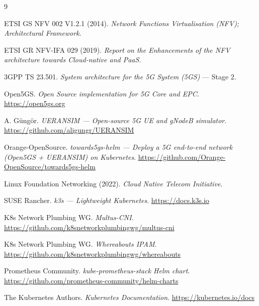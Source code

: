\documentclass[12pt]{article}
\begin{document}
\newpage
\begin{thebibliography}{9}

ETSI GS NFV 002 V1.2.1 (2014). \textit{Network Functions Virtualisation (NFV); Architectural Framework}.

ETSI GR NFV-IFA 029 (2019). \textit{Report on the Enhancements of the NFV architecture towards Cloud-native and PaaS}.

3GPP TS 23.501. \textit{System architecture for the 5G System (5GS)} --- Stage 2.

Open5GS. \textit{Open Source implementation for 5G Core and EPC}. \url{https://open5gs.org}

A. G\"ung\"or. \textit{UERANSIM --- Open-source 5G UE and gNodeB simulator}. \url{https://github.com/aligungr/UERANSIM}

Orange-OpenSource. \textit{towards5gs-helm --- Deploy a 5G end-to-end network (Open5GS + UERANSIM) on Kubernetes}. \url{https://github.com/Orange-OpenSource/towards5gs-helm}

Linux Foundation Networking (2022). \textit{Cloud Native Telecom Initiative}.

SUSE Rancher. \textit{k3s — Lightweight Kubernetes}. \url{https://docs.k3s.io}

K8s Network Plumbing WG. \textit{Multus-CNI}. \url{https://github.com/k8snetworkplumbingwg/multus-cni}

K8s Network Plumbing WG. \textit{Whereabouts IPAM}. \url{https://github.com/k8snetworkplumbingwg/whereabouts}

Prometheus Community. \textit{kube-prometheus-stack Helm chart}. \url{https://github.com/prometheus-community/helm-charts}

The Kubernetes Authors. \textit{Kubernetes Documentation}. \url{https://kubernetes.io/docs}

\end{thebibliography}

\appendix

\end{document}
